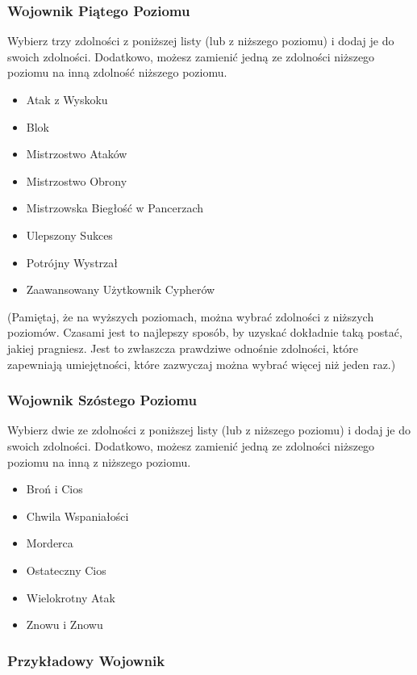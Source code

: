 \subsubsection{Wojownik Piątego Poziomu}

Wybierz trzy zdolności z poniższej listy (lub z niższego poziomu) i dodaj je do swoich zdolności. Dodatkowo, możesz zamienić jedną ze zdolności niższego poziomu na inną zdolność niższego poziomu.

\begin{itemize}
\item Atak z Wyskoku
\item Blok
\item Mistrzostwo Ataków
\item Mistrzostwo Obrony
\item Mistrzowska Biegłość w Pancerzach
\item Ulepszony Sukces
\item Potrójny Wystrzał
\item Zaawansowany Użytkownik Cypherów
\end{itemize}

(Pamiętaj, że na wyższych poziomach, można wybrać zdolności z niższych poziomów. Czasami jest to najlepszy sposób, by uzyskać dokładnie taką postać, jakiej pragniesz. Jest to zwłaszcza prawdziwe odnośnie zdolności, które zapewniają umiejętności, które zazwyczaj można wybrać więcej niż jeden raz.)

\subsubsection{Wojownik Szóstego Poziomu}

Wybierz dwie ze zdolności z poniższej listy (lub z niższego poziomu) i dodaj je do swoich zdolności. Dodatkowo, możesz zamienić jedną ze zdolności niższego poziomu na inną z niższego poziomu.

\begin{itemize}
\item Broń i Cios
\item Chwila Wspaniałości
\item Morderca
\item Ostateczny Cios
\item Wielokrotny Atak
\item Znowu i Znowu
\end{itemize}

\subsubsection{Przykładowy Wojownik}

